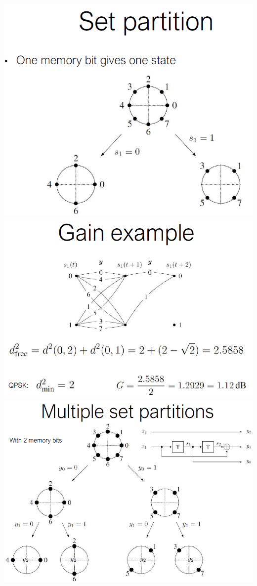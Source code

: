 \begin{multicols*}{4}
    \includegraphics[width=\columnwidth]{images/merde6.png}
    \includegraphics[width=\columnwidth]{images/merde7.png}
    \includegraphics[width=\columnwidth]{images/merde8.png}

\end{multicols*}
